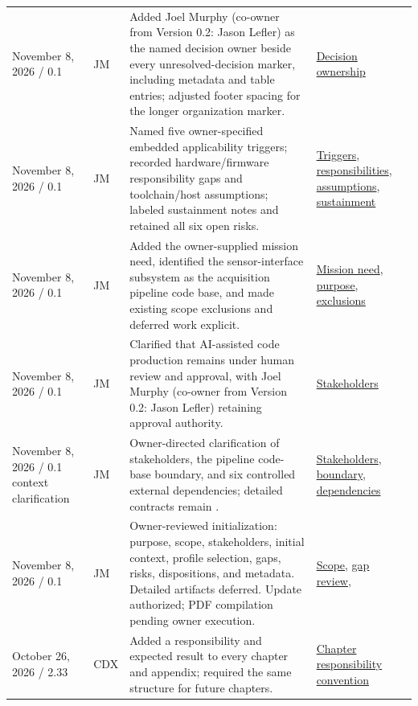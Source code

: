 \begin{tabularx}{\linewidth}{L{3.1cm}L{2.2cm}YL{2.0cm}}
November 8, 2026 / 0.1 & JM & Added Joel Murphy (co-owner from Version 0.2: Jason Lefler) as the named decision owner beside every unresolved-decision marker, including metadata and table entries; adjusted footer spacing for the longer organization marker. & \hyperref[Section:TBDDecisionOwnership]{Decision ownership}\\
November 8, 2026 / 0.1 & JM & Named five owner-specified embedded applicability triggers; recorded hardware/firmware responsibility gaps and toolchain/host assumptions; labeled sustainment notes and retained all six open risks. & \hyperref[Section:EmbeddedApplicabilityTriggers]{Triggers}, \hyperref[Section:HardwareFirmwareResponsibilities]{responsibilities}, \hyperref[Section:ToolchainHostAssumptions]{assumptions}, \hyperref[Section:ProjectSustainmentNotes]{sustainment}\\
November 8, 2026 / 0.1 & JM & Added the owner-supplied mission need, identified the sensor-interface subsystem as the acquisition pipeline code base, and made existing scope exclusions and deferred work explicit. & \hyperref[Section:ProjectMissionNeed]{Mission need}, \hyperref[Section:ProjectPurpose]{purpose}, \hyperref[Section:ProjectExclusions]{exclusions}\\
November 8, 2026 / 0.1 & JM & Clarified that AI-assisted code production remains under human review and approval, with Joel Murphy (co-owner from Version 0.2: Jason Lefler) retaining approval authority. & \hyperref[Section:ContextStakeholders]{Stakeholders}\\
November 8, 2026 / 0.1 context clarification & JM & Owner-directed clarification of stakeholders, the pipeline code-base boundary, and six controlled external dependencies; detailed contracts remain \OwnedTBD{}. & \hyperref[Section:ContextStakeholders]{Stakeholders}, \hyperref[Section:ProjectSystemBoundary]{boundary}, \hyperref[Table:ContextDependencies]{dependencies}\\
November 8, 2026 / 0.1 & JM & Owner-reviewed initialization: purpose, scope, stakeholders, initial context, profile selection, gaps, risks, dispositions, and metadata. Detailed artifacts deferred. Update authorized; PDF compilation pending owner execution. & \hyperref[Section:ProjectScope]{Scope}, \hyperref[Table:ProjectGapReview]{gap review}, \\
October 26, 2026 / 2.33 & CDX & Added a responsibility and expected result to every chapter and appendix; required the same structure for future chapters. & \hyperref[Section:ChapterResponsibilityConvention]{Chapter responsibility convention}\\

\end{tabularx}
